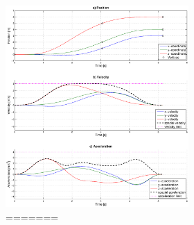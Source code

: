 \begin{figure}[h]
\begin{figure}[H]
\begin{figure}[H]
   \centering
   \includegraphics[trim = 35mm 30mm 30mm 15mm,clip,width=1\textwidth]{pics/2SegOpti5s16k2000.eps}
=======
\vspace*{3.2\baselineskip}


\end{figure}
\end{figure}
\end{figure}
